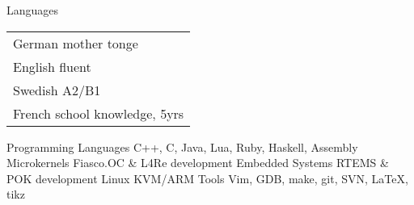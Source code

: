 \clearpage
{}
  \begin{cvskills}
  	\cvskill
		{Languages}
		{
		  \def\arraystretch{1}
		  \begin{tabular}[]{l}
		  German \hspace{4.9mm} mother tonge \\
		  English \hspace{6mm} fluent \\
		  Swedish \hspace{4.5mm} A2/B1 \\
		  French \hspace{6.6mm} school knowledge, 5yrs
		  \end{tabular}
		  \def\arraystretch{1.2}
		}
	\cvskill
		{Programming Languages}
		{C++, C, Java, Lua, Ruby, Haskell, Assembly}
	\cvskill
		{Microkernels}
		{Fiasco.OC \& L4Re development}
	\cvskill
		{Embedded Systems}
		{RTEMS \& POK development}
	\cvskill
		{Linux}
		{KVM/ARM}
	\cvskill
		{Tools}
		{Vim, GDB, make, git, SVN, LaTeX, tikz}
  \end{cvskills}
